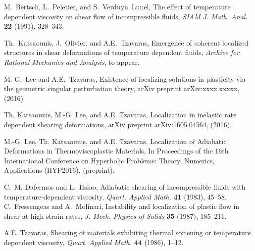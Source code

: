 \documentclass[a4paper,11pt]{article}
\begin{document}
\begin{thebibliography}{10}

{\sc M.~Bertsch, L.~Peletier, and S.~Verduyn~Lunel}, 
The effect of temperature dependent viscosity on shear flow of  incompressible fluids,
{\it SIAM J. Math. Anal.} {\bf 22 } (1991), 328--343.


{\sc Th.~Katsaounis, J.~Olivier, and A.E.~Tzavaras}, 
Emergence of coherent localized structures in shear deformations of
  temperature dependent fluids, {\em Archive for Rational Mechanics and Analysis}, to appear.

  
{\sc M.-G.~Lee and A.E.~Tzavaras},
Existence of localizing solutions in plasticity via the geometric singular perturbation theory, arXiv preprint arXiv:xxxx.xxxxx,  (2016)

{\sc Th. Katsaounis, M.-G. Lee, and A.E. Tzavaras}, 
Localization in inelastic rate dependent shearing deformations, arXiv preprint arXiv:1605.04564,  (2016).

{\sc M.-G. Lee, Th. Katsaounis, and A.E. Tzavaras}, 
Localization of Adiabatic Deformations in Thermoviscoplastic Materials, In Proceedings of the 16th International Conference on Hyperbolic Problems: Theory, Numerics, Applications (HYP2016), (preprint).


{\sc C.~M. Dafermos and L.~Hsiao}, 
Adiabatic shearing of incompressible fluids with temperature-dependent viscosity.
{\em Quart.  Applied Math.} {\bf 41} (1983), 45--58.
% 
% 
{\sc C.~Fressengeas and A.~Molinari}, 
Instability and localization of plastic flow in shear at high strain rates, 
  {\em J.  Mech. Physics of Solids} {\bf 35} (1987), 185--211.
% 
%   
%   

% 
% 
{\sc A.E. Tzavaras},
Shearing of materials exhibiting thermal softening or temperature dependent viscosity,
{\em Quart.  Applied Math.} {\bf 44} (1986), 1--12.


\end{thebibliography}
\end{document}
